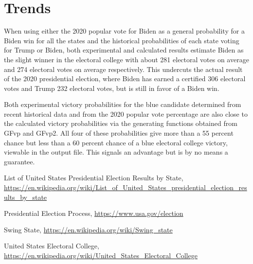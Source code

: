 \documentclass[12pt]{article}
\begin{document}
\section{Trends}

When using either the 2020 popular vote for Biden as a general probability for a Biden win for all the states and the historical probabilities of each state voting for Trump or Biden, both experimental and calculated results estimate Biden as the slight winner in the electoral college with about 281 electoral votes on average and 274 electoral votes on average respectively. This undercuts the actual result of the 2020 presidential election, where Biden has earned a certified 306 electoral votes and Trump 232 electoral votes, but is still in favor of a Biden win. 

Both experimental victory probabilities for the blue candidate determined from recent historical data and from the 2020 popular vote percentage are also close to the calculated victory probabilities via the generating functions obtained from GFvp and GFvp2. All four of these probabilities give more than a 55 percent chance but less than a 60 percent chance of a blue electoral college victory, viewable in the output file. This signals an advantage but is by no means a guarantee.

\begin{thebibliography}{4}

List of United States Presidential Election Results by State,
\url{https://en.wikipedia.org/wiki/List_of_United_States_presidential_election_results_by_state}

Presidential Election Process,
\url{https://www.usa.gov/election}

Swing State,
\url{https://en.wikipedia.org/wiki/Swing\_state}

United States Electoral College,
\url{https://en.wikipedia.org/wiki/United_States_Electoral_College}
\end{thebibliography}
\end{document}
